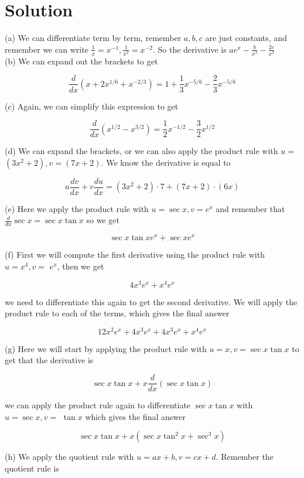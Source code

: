 \documentclass[10pt]{article}
\begin{document}
\section*{Solution}
(a) We can differentiate term by term, remember $a, b, c$ are just constants, and remember we can write $\frac{1}{x}=x^{-1}, \frac{1}{x^{2}}=x^{-2}$. So the derivative is $a e^{x}-\frac{b}{x^{2}}-\frac{2 c}{x^{3}}$\\
(b) We can expand out the brackets to get

$$
\frac{d}{d x}\left(x+2 x^{1 / 6}+x^{-2 / 3}\right)=1+\frac{1}{3} x^{-5 / 6}-\frac{2}{3} x^{-5 / 6}
$$

(c) Again, we can simplify this expression to get

$$
\frac{d}{d x}\left(x^{1 / 2}-x^{3 / 2}\right)=\frac{1}{2} x^{-1 / 2}-\frac{3}{2} x^{1 / 2}
$$

(d) We can expand the brackets, or we can also apply the product rule with $u=$ $\left(3 x^{2}+2\right), v=(7 x+2)$. We know the derivative is equal to

$$
u \frac{d v}{d x}+v \frac{d u}{d x}=\left(3 x^{2}+2\right) \cdot 7+(7 x+2) \cdot(6 x)
$$

(e) Here we apply the product rule with $u=\sec x, v=e^{x}$ and remember that $\frac{d}{d x} \sec x=\sec x \tan x$ so we get

$$
\sec x \tan x e^{x}+\sec x e^{x}
$$

(f) First we will compute the first derivative using the product rule with $u=x^{4}, v=$ $e^{x}$, then we get

$$
4 x^{3} e^{x}+x^{4} e^{x}
$$

we need to differentiate this again to get the second derivative. We will apply the product rule to each of the terms, which gives the final answer

$$
12 x^{2} e^{x}+4 x^{3} e^{x}+4 x^{3} e^{x}+x^{4} e^{x}
$$

(g) Here we will start by applying the product rule with $u=x, v=\sec x \tan x$ to get that the derivative is

$$
\sec x \tan x+x \frac{d}{d x}(\sec x \tan x)
$$

we can apply the product rule again to differentiate $\sec x \tan x$ with $u=\sec x, v=$ $\tan x$ which gives the final answer

$$
\sec x \tan x+x\left(\sec x \tan ^{2} x+\sec ^{3} x\right)
$$

(h) We apply the quotient rule with $u=a x+b, v=c x+d$. Remember the quotient rule is
\end{document}
